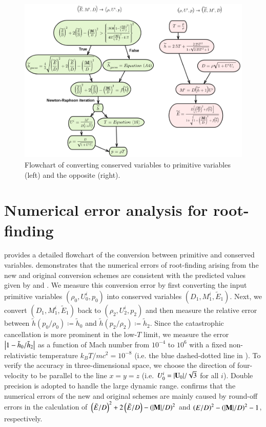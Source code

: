 \documentclass[twocolumn]{aastex63}
\begin{document}
\begin{figure}
\includegraphics[width=\linewidth]{screenshot.png}
\caption{Flowchart of converting conserved variables to primitive variables (left) and the opposite (right).}
\label{fig:flowchart}
\end{figure}

\section{Numerical error analysis for root-finding}
\label{Appendix:Numerical error analysis}
 provides a detailed flowchart of the conversion between primitive and conserved variables.  demonstrates that the numerical errors of root-finding arising from the new and original conversion schemes are consistent with the predicted values given by  and . We measure this conversion error by first converting the input primitive variables $(\rho_0, U^{i}_0, p_0)$ into conserved variables $(D_1, M^{i}_1, \tilde{E}_1)$. Next, we convert $(D_1, M^{i}_1, \tilde{E}_1)$ back to $(\rho_2, U^{i}_2, p_2)$ and then measure the relative error between $\tilde{h}(p_0/\rho_0)\coloneqq\tilde{h}_{0}$ and $\tilde{h}(p_2/\rho_2)\coloneqq\tilde{h}_{2}$. Since the catastrophic cancellation is more prominent in the low-$T$ limit, we measure the error $\abs{1-\tilde{h}_{0}/\tilde{h}_{2}}$ as a function of Mach number from $10^{-4}$ to $10^{6}$ with a fixed non-relativistic temperature $k_{B}T/mc^2=10^{-8}$ (i.e. the blue dashed-dotted line in ). To verify the accuracy in three-dimensional space, we choose the direction of four-velocity to be parallel to the line $x=y=z$ (i.e. $U^i_0=\abs{\mathbf{U}_0}/\sqrt{3}$ for all $i$). Double precision is adopted to handle the large dynamic range.  confirms that the numerical errors of the new and original schemes are mainly caused by round-off errors in the calculation of $\left(\tilde{E}/D\right)^2+2\left(\tilde{E}/D\right)-\left(\abs{\mathbf{M}}/D\right)^2$ and $\left(E/D\right)^2-\left(\abs{\mathbf{M}}/D\right)^2-1$, respectively.
\end{document}

